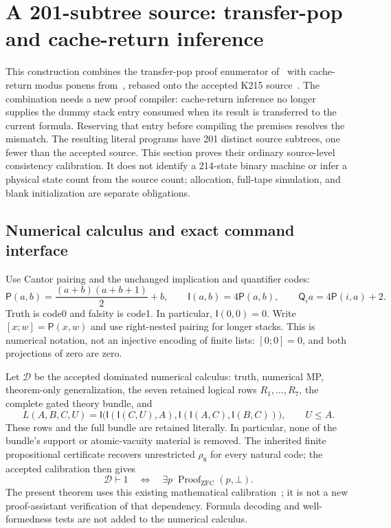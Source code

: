 \begingroup
\newcommand{\ctP}{\mathsf P}
\newcommand{\ctI}{\mathsf I}
\newcommand{\ctQ}{\mathsf Q}
\newcommand{\ctD}{\mathcal D}
\newcommand{\ctS}{\mathsf S}
\newcommand{\ctMP}{\mathsf{MP}}
\newcommand{\ctAX}{\mathsf{AX}}
\newcommand{\ctH}{\mathsf H}
\newcommand{\ctPush}{\mathsf{PUSH}}
\newcommand{\ctDiscard}{\mathsf{DISCARD}}
\newcommand{\ctBlock}{\mathcal B}

\section{A 201-subtree source: transfer-pop and cache-return inference}
\label{sec:cache-calculus}

This construction combines the transfer-pop proof enumerator
of~\cite{transfer} with cache-return modus ponens from~\cite{cachemp},
rebased onto the accepted K215 source~\cite{k215}. The combination needs
a new proof compiler: cache-return inference no longer supplies the
dummy stack entry consumed when its result is transferred to the current
formula. Reserving that entry before compiling the premises resolves
the mismatch. The resulting literal programs have 201 distinct source
subtrees, one fewer than the accepted source. This section proves their
ordinary source-level consistency calibration. It does not identify a
214-state binary machine or infer a physical state count from the
source count; allocation, full-tape simulation, and blank initialization
are separate obligations.

\subsection{Numerical calculus and exact command interface}

Use Cantor pairing and the unchanged implication and quantifier codes:
\[
 \ctP(a,b)=\frac{(a+b)(a+b+1)}2+b,\qquad
 \ctI(a,b)=4\ctP(a,b),\qquad
 \ctQ_i a=4\ctP(i,a)+2.
\]
Truth is code0 and falsity is code1. In particular,
$\ctI(0,0)=0$. Write $[x;w]=\ctP(x,w)$ and use right-nested
pairing for longer stacks. This is numerical notation, not an
injective encoding of finite lists: $[0;0]=0$, and both projections
of zero are zero.

Let $\ctD$ be the accepted dominated numerical calculus: truth,
numerical MP, theorem-only generalization, the seven retained logical
rows $R_1,\ldots,R_7$, the complete gated theory bundle, and
\[
 L(A,B,C,U)=
 \ctI\bigl(\ctI(\ctI(C,U),A),
             \ctI(\ctI(A,C),\ctI(B,C))\bigr),\qquad U\leq A.
\]
These rows and the full bundle are retained literally. In particular,
none of the bundle's support or atomic-vacuity material is removed.
The inherited finite propositional certificate recovers unrestricted
$\rho_8$ for every natural code; the accepted calibration then gives
\begin{equation}
 \ctD\vdash1\quad\Longleftrightarrow\quad
 \exists p\;\operatorname{Proof}_{\mathrm{ZFC}}(p,\bot).
 \label{eq:ct-inherited}
\end{equation}
The present theorem uses this existing mathematical
calibration~\cite{k215}; it is not a new proof-assistant verification
of that dependency. Formula decoding and well-formedness tests are
not added to the numerical calculus.

